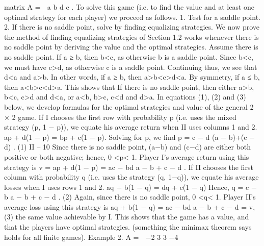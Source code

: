 matrix
A =
 a b
d c
.
To solve this game (i.e. to find the value and at least one optimal strategy for each player)
we proceed as follows.
1. Test for a saddle point.
2. If there is no saddle point, solve by finding equalizing strategies.
We now prove the method of finding equalizing strategies of Section 1.2 works whenever
there is no saddle point by deriving the value and the optimal strategies.
Assume there is no saddle point. If a ≥ b, then b<c, as otherwise b is a saddle point.
Since b<c, we must have c>d, as otherwise c is a saddle point. Continuing thus, we see
that d<a and a>b. In other words, if a ≥ b, then a>b<c>d<a. By symmetry, if
a ≤ b, then a<b>c<d>a. This shows that
If there is no saddle point, then either a>b, b<c, c>d and d<a, or a<b, b>c,
c<d and d>a.
In equations (1), (2) and (3) below, we develop formulas for the optimal strategies
and value of the general 2 × 2 game. If I chooses the first row with probability p (i.e. uses
the mixed strategy (p, 1 − p)), we equate his average return when II uses columns 1 and 2.
ap + d(1 − p) = bp + c(1 − p).
Solving for p, we find
p = c − d
(a − b)+(c − d)
. (1)
II – 10
Since there is no saddle point, (a−b) and (c−d) are either both positive or both negative;
hence, 0 <p< 1. Player I’s average return using this strategy is
v = ap + d(1 − p) = ac − bd
a − b + c − d
.
If II chooses the first column with probability q (i.e. uses the strategy (q, 1−q)), we equate
his average losses when I uses rows 1 and 2.
aq + b(1 − q) = dq + c(1 − q)
Hence,
q = c − b
a − b + c − d
. (2)
Again, since there is no saddle point, 0 <q< 1. Player II’s average loss using this strategy
is
aq + b(1 − q) = ac − bd
a − b + c − d = v, (3)
the same value achievable by I. This shows that the game has a value, and that the players
have optimal strategies. (something the minimax theorem says holds for all finite games).
Example 2.
A =
 −2 3
3 −4

